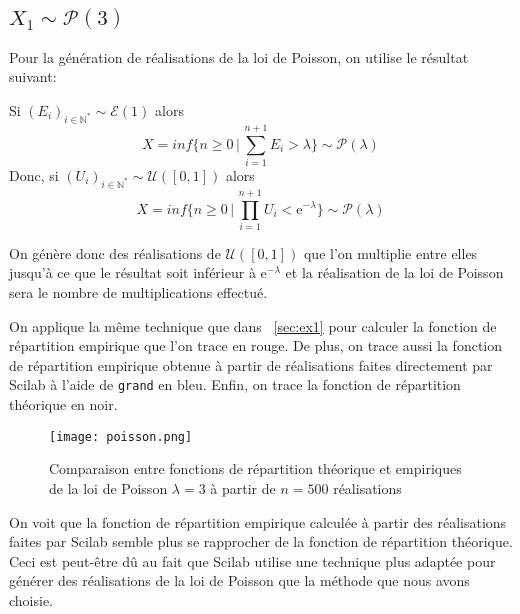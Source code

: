 \documentclass{article}
\begin{document}
\begin{multicols}{2}
\subsection{$X_1 \sim \mathcal{P}(3)$}\label{subsec:ex21}

Pour la génération de réalisations de la loi de Poisson, on utilise le résultat
suivant:

Si $(E_i)_{i \in \mathbb{N}^*} \sim \mathcal{E}(1)$ alors
\begin{equation}
    X = inf\{n \geq 0 \,|\, \sum_{i = 1}^{n + 1} E_i > \lambda\} \sim
        \mathcal{P}(\lambda)
\end{equation}
Donc, si $(U_i)_{i \in \mathbb{N}^*} \sim \mathcal{U}([0, 1])$ alors
\begin{equation}
    X = inf\{n \geq 0 \,|\, \prod_{i = 1}^{n + 1} U_i < \mathrm{e}^{-\lambda}\}
        \sim \mathcal{P}(\lambda)
\end{equation}

On génère donc des réalisations de $\mathcal{U}([0, 1])$ que l'on multiplie
entre elles jusqu'à ce que le résultat soit inférieur à $\mathrm{e}^{-\lambda}$
et la réalisation de la loi de Poisson sera le nombre de multiplications
effectué.

On applique la même technique que dans ~\ref{sec:ex1} pour calculer la fonction
de répartition empirique que l'on trace en rouge. De plus, on trace aussi la
fonction de répartition empirique obtenue à partir de réalisations faites
directement par Scilab à l'aide de \texttt{grand} en bleu. Enfin, on trace la
fonction de répartition théorique en noir.

\begin{figure}[H]
    \begin{center}
        \texttt{[image: poisson.png]}
        \centering
        \captionsetup{justification=centering}
        \caption{\label{fig:poisson}Comparaison entre fonctions de répartition théorique et empiriques de la loi de Poisson $\lambda = 3$ à partir de $n = 500$ réalisations}
    \end{center}
\end{figure}

On voit que la fonction de répartition empirique calculée à partir des
réalisations faites par Scilab semble plus se rapprocher de la fonction de
répartition théorique. Ceci est peut-être dû au fait que Scilab utilise une
technique plus adaptée pour générer des réalisations de la loi de Poisson que
la méthode que nous avons choisie.


\end{multicols}
\end{document}

